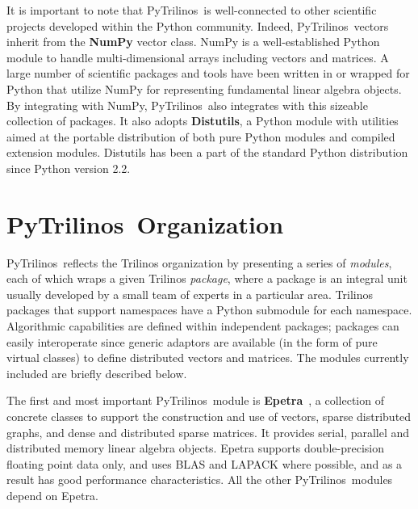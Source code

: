 \documentclass{llncs}
\newcommand{\PyTrilinos}{{\sc PyTrilinos}}
\begin{document}
It is important to note that \PyTrilinos\ is well-connected to other scientific
projects developed within the Python community. Indeed, \PyTrilinos\ vectors
inherit from the {\bf NumPy} vector class. NumPy is
a well-established Python module to handle multi-dimensional arrays including
vectors and matrices.  A large number of scientific packages and tools have
been written in or wrapped for Python that utilize NumPy for representing
fundamental linear algebra objects.  By integrating with NumPy, \PyTrilinos\
also integrates with this sizeable collection of packages. It also adopts {\bf
Distutils}, a Python module with utilities aimed at the portable distribution
of both pure Python modules and compiled extension modules.  Distutils has
been a part of the standard Python distribution since Python version 2.2.

\section{\PyTrilinos\ Organization}
\label{sec:organization}

\PyTrilinos\ reflects the Trilinos organization by presenting a series
of {\sl modules}, each of which wraps a given Trilinos {\sl package},
where a package is an integral unit usually developed by a small team
of experts in a particular area.  Trilinos packages that support
namespaces have a Python submodule for each namespace.  Algorithmic
capabilities are defined within independent packages; packages can
easily interoperate since generic adaptors are available (in the form
of pure virtual classes) to define distributed vectors and matrices. The
modules currently included are briefly described below.

\smallskip

\noindent 
The first and most important \PyTrilinos\ module is {\bf
Epetra}~\cite{Epetra-Ref-Guide}, a collection of concrete classes to support
the construction and use of vectors, sparse distributed graphs, and dense and
distributed sparse matrices.  It provides serial, parallel and distributed
memory linear algebra objects.  Epetra supports double-precision floating
point data only, and uses BLAS and LAPACK where possible, and as a result has
good performance characteristics.  All the other \PyTrilinos\ modules depend on
Epetra. 

\smallskip
\end{document}
